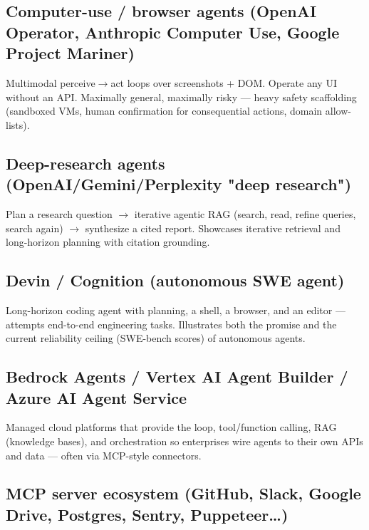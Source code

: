 \documentclass[11pt]{article}
\begin{document}
\subsection{Computer-use / browser agents (OpenAI Operator, Anthropic Computer Use, Google Project Mariner)}\label{computer-use--browser-agents-openai-operator-anthropic-computer-use-google-project-mariner}

Multimodal perceive\(\rightarrow\)act loops over screenshots + DOM. Operate any UI without an API. Maximally general, maximally risky --- heavy safety scaffolding (sandboxed VMs, human confirmation for consequential actions, domain allow-lists).

\subsection{Deep-research agents (OpenAI/Gemini/Perplexity "deep research")}\label{deep-research-agents-openaigeminiperplexity-deep-research}

Plan a research question \(\rightarrow\) iterative agentic RAG (search, read, refine queries, search again) \(\rightarrow\) synthesize a cited report. Showcases iterative retrieval and long-horizon planning with citation grounding.

\subsection{Devin / Cognition (autonomous SWE agent)}\label{devin--cognition-autonomous-swe-agent}

Long-horizon coding agent with planning, a shell, a browser, and an editor --- attempts end-to-end engineering tasks. Illustrates both the promise and the current reliability ceiling (SWE-bench scores) of autonomous agents.

\subsection{Bedrock Agents / Vertex AI Agent Builder / Azure AI Agent Service}\label{bedrock-agents--vertex-ai-agent-builder--azure-ai-agent-service}

Managed cloud platforms that provide the loop, tool/function calling, RAG (knowledge bases), and orchestration so enterprises wire agents to their own APIs and data --- often via MCP-style connectors.

\subsection{MCP server ecosystem (GitHub, Slack, Google Drive, Postgres, Sentry, Puppeteer\ldots)}\label{mcp-server-ecosystem-github-slack-google-drive-postgres-sentry-puppeteer}
\end{document}
